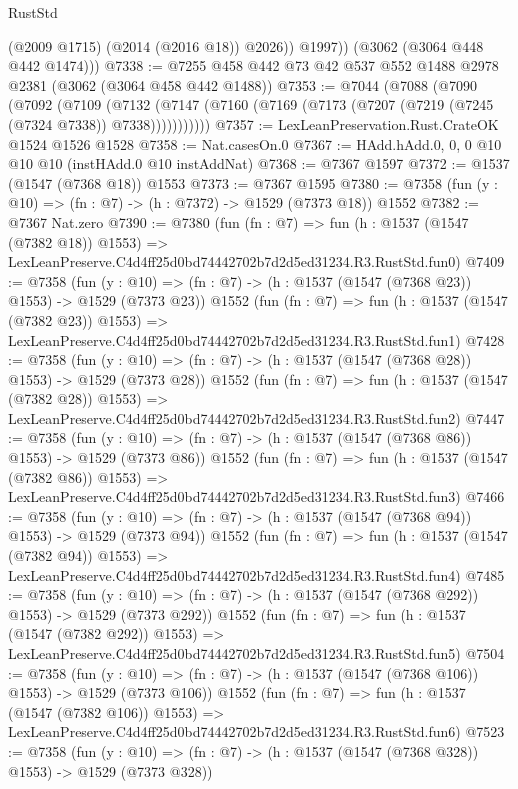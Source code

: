 \begin{lexlean}{RustStd}
\begin{coremodule}
              (@2009 @1715)
              (@2014 (@2016 @18))
              @2026))
          @1997))
      (@3062 (@3064 @448 @442 @1474)))
@7338 := @7255 @458 @442 @73 @42 @537 @552 @1488 @2978 @2381 (@3062 (@3064 @458 @442 @1488))
@7353 := @7044
    (@7088
      (@7090
        (@7092
          (@7109
            (@7132 (@7147 (@7160 (@7169 (@7173 (@7207 (@7219 (@7245 (@7324 @7338)) @7338)))))))))))
@7357 := LexLeanPreservation.Rust.CrateOK @1524 @1526 @1528
@7358 := Nat.casesOn.{0}
@7367 := HAdd.hAdd.{0, 0, 0} @10 @10 @10 (instHAdd.{0} @10 instAddNat)
@7368 := @7367 @1597
@7372 := @1537 (@1547 (@7368 @18)) @1553
@7373 := @7367 @1595
@7380 := @7358 (fun (y : @10) => (fn : @7) -> (h : @7372) -> @1529 (@7373 @18)) @1552
@7382 := @7367 Nat.zero
@7390 := @7380
    (fun (fn : @7) =>
    fun (h : @1537 (@1547 (@7382 @18)) @1553) =>
    LexLeanPreserve.C4d4ff25d0bd74442702b7d2d5ed31234.R3.RustStd.fun0)
@7409 := @7358
    (fun (y : @10) => (fn : @7) -> (h : @1537 (@1547 (@7368 @23)) @1553) -> @1529 (@7373 @23))
    @1552
    (fun (fn : @7) =>
    fun (h : @1537 (@1547 (@7382 @23)) @1553) =>
    LexLeanPreserve.C4d4ff25d0bd74442702b7d2d5ed31234.R3.RustStd.fun1)
@7428 := @7358
    (fun (y : @10) => (fn : @7) -> (h : @1537 (@1547 (@7368 @28)) @1553) -> @1529 (@7373 @28))
    @1552
    (fun (fn : @7) =>
    fun (h : @1537 (@1547 (@7382 @28)) @1553) =>
    LexLeanPreserve.C4d4ff25d0bd74442702b7d2d5ed31234.R3.RustStd.fun2)
@7447 := @7358
    (fun (y : @10) => (fn : @7) -> (h : @1537 (@1547 (@7368 @86)) @1553) -> @1529 (@7373 @86))
    @1552
    (fun (fn : @7) =>
    fun (h : @1537 (@1547 (@7382 @86)) @1553) =>
    LexLeanPreserve.C4d4ff25d0bd74442702b7d2d5ed31234.R3.RustStd.fun3)
@7466 := @7358
    (fun (y : @10) => (fn : @7) -> (h : @1537 (@1547 (@7368 @94)) @1553) -> @1529 (@7373 @94))
    @1552
    (fun (fn : @7) =>
    fun (h : @1537 (@1547 (@7382 @94)) @1553) =>
    LexLeanPreserve.C4d4ff25d0bd74442702b7d2d5ed31234.R3.RustStd.fun4)
@7485 := @7358
    (fun (y : @10) => (fn : @7) -> (h : @1537 (@1547 (@7368 @292)) @1553) -> @1529 (@7373 @292))
    @1552
    (fun (fn : @7) =>
    fun (h : @1537 (@1547 (@7382 @292)) @1553) =>
    LexLeanPreserve.C4d4ff25d0bd74442702b7d2d5ed31234.R3.RustStd.fun5)
@7504 := @7358
    (fun (y : @10) => (fn : @7) -> (h : @1537 (@1547 (@7368 @106)) @1553) -> @1529 (@7373 @106))
    @1552
    (fun (fn : @7) =>
    fun (h : @1537 (@1547 (@7382 @106)) @1553) =>
    LexLeanPreserve.C4d4ff25d0bd74442702b7d2d5ed31234.R3.RustStd.fun6)
@7523 := @7358
    (fun (y : @10) => (fn : @7) -> (h : @1537 (@1547 (@7368 @328)) @1553) -> @1529 (@7373 @328))

\end{coremodule}
\end{lexlean}
